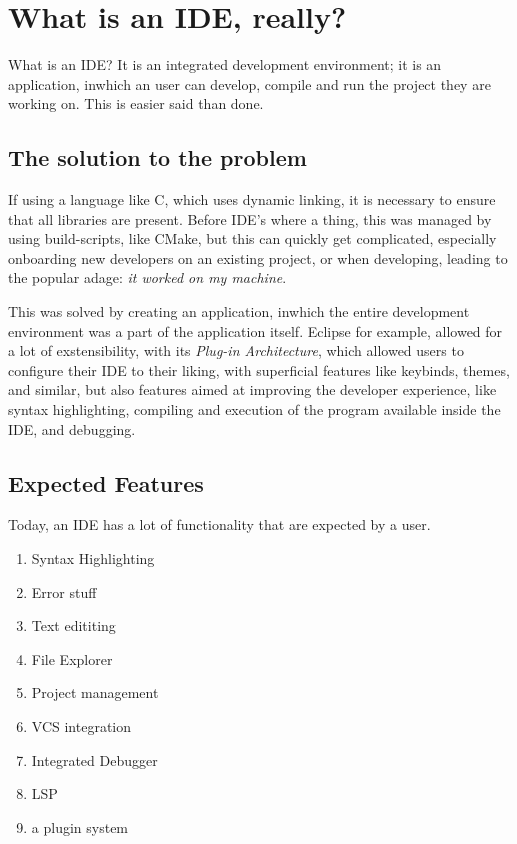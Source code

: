 \documentclass[runningheads]{llncs}
\begin{document}
\section{What is an IDE, really?}
What is an IDE? It is an integrated development environment; it is an
application, inwhich an user can develop, compile and run the project they are
working on. This is easier said than done.

\subsection{The solution to the problem}
If using a language like C, which uses dynamic linking, it is necessary to
ensure that all libraries are present. Before IDE's where a thing, this was
managed by using build-scripts, like CMake, but this can quickly get
complicated, especially onboarding new developers on an existing project, or
when developing, leading to the popular adage: \textit{it worked on my machine}.

This was solved by creating an application, inwhich the entire development
environment was a part of the application itself. Eclipse for example, allowed
for a lot of exstensibility, with its \textit{Plug-in Architecture}, which
allowed users to configure their IDE to their liking, with superficial features
like keybinds, themes, and similar, but also features aimed at improving the
developer experience, like syntax highlighting, compiling and execution of the
program available inside the IDE, and debugging.

\subsection{Expected Features}
Today, an IDE has a lot of functionality that are expected by a user.
\begin{enumerate}
  \item Syntax Highlighting
  \item Error stuff %
  \item Text edititing
  \item File Explorer
  \item Project management
  \item VCS integration
  \item Integrated Debugger
  \item LSP
  \item a plugin system
\end{enumerate}
\end{document}
